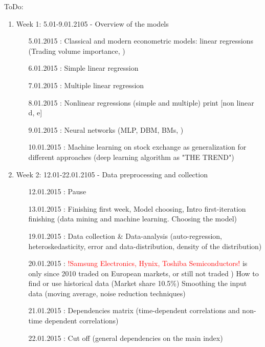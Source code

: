 \documentclass {article}
\begin{document}
ToDo:
\begin{enumerate}
	\item Week 1: 5.01-9.01.2105 - Overview of the models 
	\begin{enumerate}
		\item[5.01.2015]: Classical and modern econometric models:  linear regressions (Trading volume importance, ) 
		\item[6.01.2015]: Simple linear regression 	 		  
		\item[7.01.2015]: Multiple linear regression  
		\item[8.01.2015]: Nonlinear regressions (simple and multiple) print [non linear d, e]  
		\item[9.01.2015]: Neural networks (MLP, DBM, BMs, )
		\item[10.01.2015]: Machine learning on stock exchange as generalization for different approaches (deep learning algorithm as "THE TREND") 
	\end{enumerate}
	\item Week 2: 12.01-22.01.2105 - Data preprocessing and collection
	\begin{enumerate}
		\item[12.01.2015]: Pause  
		\item[13.01.2015]: Finishing first week, Model choosing, Intro first-iteration finishing (data mining and machine learning. Choosing the model)  
		\item[19.01.2015]: Data collection  \& Data-analysis (auto-regression, heteroskedasticity, error and data-distribution, density of the distribution)
		\item[20.01.2015]: \textcolor{red}{!Samsung Electronics, Hynix, Toshiba Semiconductors!} is only since 2010 traded on European markets, or still not traded ) How to find or use historical data (Market share 10.5\%)
		Smoothing the input data (moving average, noise reduction techniques)
		\item[21.01.2015]: Dependencies matrix  (time-dependent correlations and non-time dependent correlations)
		\item[22.01.2015]: Cut off (general dependencies on the main index)
		

\end{enumerate}
\end{enumerate}
\end{document}
